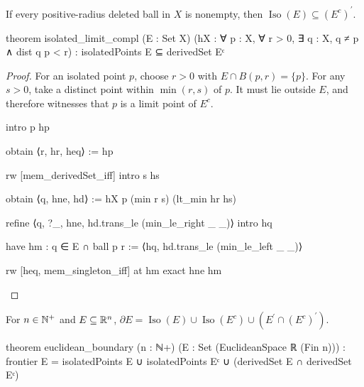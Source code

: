 \begin{lemma}
  \label{an1:lem:isolated-limit-compl}
  If every positive-radius deleted ball in $X$ is nonempty, then
  $\operatorname{Iso}(E)\subseteq(E^{c})^{\prime}$.

  \begin{lean}
    theorem isolated_limit_compl (E : Set X)
        (hX : ∀ p : X, ∀ r > 0, ∃ q : X, q ≠ p ∧ dist q p < r) :
        isolatedPoints E ⊆ derivedSet Eᶜ
  \end{lean}
\end{lemma}

\begin{proof}
  For an isolated point $p$, choose $r>0$ with $E\cap B(p,r)=\{p\}$.
  For any $s>0$, take a distinct point within $\min(r,s)$ of $p$.
  It must lie outside $E$, and therefore witnesses that $p$ is a limit point of $E^{c}$.

  \begin{lean}
    intro p hp

    obtain ⟨r, hr, heq⟩ := hp

    rw [mem_derivedSet_iff]
    intro s hs

    obtain ⟨q, hne, hd⟩ := hX p (min r s) (lt_min hr hs)

    refine ⟨q, ?_, hne, hd.trans_le (min_le_right _ _)⟩
    intro hq

    have hm : q ∈ E ∩ ball p r := ⟨hq, hd.trans_le (min_le_left _ _)⟩

    rw [heq, mem_singleton_iff] at hm
    exact hne hm
  \end{lean}

\end{proof}

\begin{proposition}
  \label{an1:thm:properties-of-boundary-in-rn}
  For $n\in\mathbb{N}^{+}$ and $E\subseteq\mathbb{R}^{n}$, $\partial
    E=\operatorname{Iso}(E)\cup\operatorname{Iso}(E^{c})\cup(E^{\prime}\cap(E^{c})^{\prime})$.

  \begin{lean}
    theorem euclidean_boundary (n : ℕ+)
        (E : Set (EuclideanSpace ℝ (Fin n))) :
        frontier E = isolatedPoints E ∪ isolatedPoints Eᶜ ∪
          (derivedSet E ∩ derivedSet Eᶜ)
  \end{lean}
\end{proposition}

